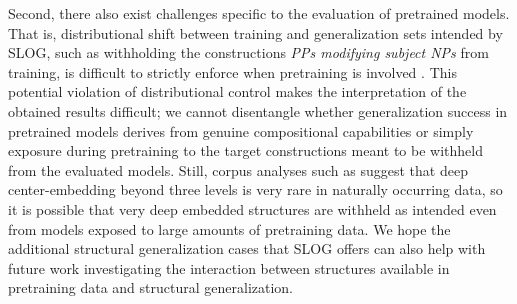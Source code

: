 Second, there also exist challenges specific to the evaluation of pretrained models. That is, distributional shift between training and generalization sets intended by SLOG, such as withholding the constructions \textit{PPs modifying subject NPs} from training, is difficult to strictly enforce when pretraining is involved \cite{kim2022uncontrolled}. This potential violation of distributional control makes the interpretation of the obtained results difficult; we cannot disentangle whether generalization success in pretrained models derives from genuine compositional capabilities or simply exposure during pretraining to the target constructions meant to be withheld from the evaluated models. Still, corpus analyses such as \citet{karlsson2007constraints} suggest that deep center-embedding beyond three levels is very rare in naturally occurring data, so it is possible that very deep embedded structures are withheld as intended even from models exposed to large amounts of pretraining data. We hope the additional structural generalization cases that SLOG offers can also help with future work investigating the interaction between structures available in pretraining data and structural generalization.